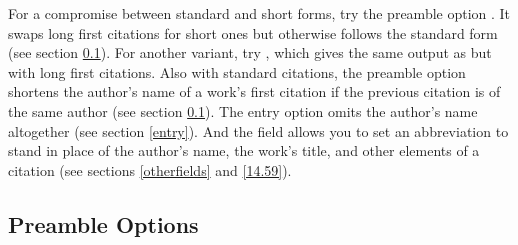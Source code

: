 \documentclass[11pt,letterpaper,oneside]{article}
\begin{document}
\begin{citeonly}
\item \cite[3]{morrison2004a}
\item \cite[18]{morrison2004a}
\item \cite[18]{morrison2004a}
\item \cite[24--26]{morrison2004a}
\item \cite[401-2]{morrison2004b}
\item \cite[433]{morrison2004b}
\item \cite[37--38]{diaz2008}
\item \cite[403]{morrison2004b}
\item \cite[152]{diaz2008}
\item \cite[201-2]{diaz2008}
\item \cites[240]{morrison2004b}[32]{morrison2004a}
\item \cite[33]{morrison2004a}
\end{citeonly}

For a compromise between standard and short forms, try the  preamble
option . It swaps long first citations for short ones
but otherwise follows the standard form (see section \ref{preamble}).
For another variant, try , which gives the same output
as  but with long first citations. Also with standard
citations, the preamble option  shortens the author's
name of a work's first citation if the previous citation is of the
same author (see section \ref{preamble}). The entry option
 omits the author's name altogether (see section
\ref{entry}). And the  field allows you to set an
abbreviation to stand in place of the author's name, the work's title,
and other elements of a citation (see sections \ref{otherfields} and
\ref{14.59}).

\subsection{Preamble Options}
\label{preamble}
\end{document}
